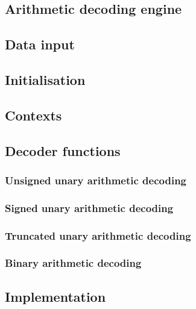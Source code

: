 

\subsection{Arithmetic decoding engine}
\subsection{Data input}
\subsection{Initialisation}
\subsection{Contexts}
\subsection{Decoder functions}
\subsubsection{Unsigned unary arithmetic decoding}
\subsubsection{Signed unary arithmetic decoding}
\subsubsection{Truncated unary arithmetic decoding}
\subsubsection{Binary arithmetic decoding}
\subsection{Implementation}
